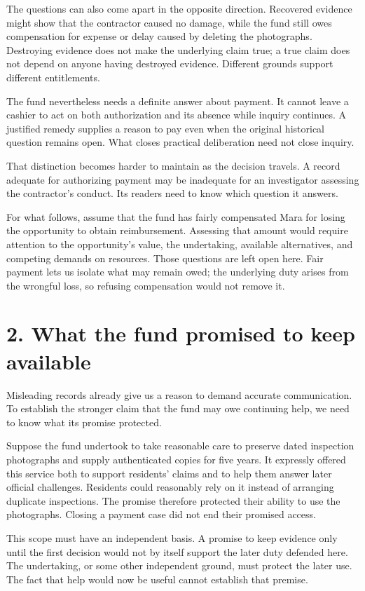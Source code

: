 The questions can also come apart in the opposite direction. Recovered evidence might show that the contractor caused no damage, while the fund still owes compensation for expense or delay caused by deleting the photographs. Destroying evidence does not make the underlying claim true; a true claim does not depend on anyone having destroyed evidence. Different grounds support different entitlements.

The fund nevertheless needs a definite answer about payment. It cannot leave a cashier to act on both authorization and its absence while inquiry continues. A justified remedy supplies a reason to pay even when the original historical question remains open. What closes practical deliberation need not close inquiry.

That distinction becomes harder to maintain as the decision travels. A record adequate for authorizing payment may be inadequate for an investigator assessing the contractor’s conduct. Its readers need to know which question it answers.

For what follows, assume that the fund has fairly compensated Mara for losing the opportunity to obtain reimbursement. Assessing that amount would require attention to the opportunity’s value, the undertaking, available alternatives, and competing demands on resources. Those questions are left open here. Fair payment lets us isolate what may remain owed; the underlying duty arises from the wrongful loss, so refusing compensation would not remove it.

\section*{2. What the fund promised to keep available}

Misleading records already give us a reason to demand accurate communication. To establish the stronger claim that the fund may owe continuing help, we need to know what its promise protected.

Suppose the fund undertook to take reasonable care to preserve dated inspection photographs and supply authenticated copies for five years. It expressly offered this service both to support residents’ claims and to help them answer later official challenges. Residents could reasonably rely on it instead of arranging duplicate inspections. The promise therefore protected their ability to use the photographs. Closing a payment case did not end their promised access.

This scope must have an independent basis. A promise to keep evidence only until the first decision would not by itself support the later duty defended here. The undertaking, or some other independent ground, must protect the later use. The fact that help would now be useful cannot establish that premise.

